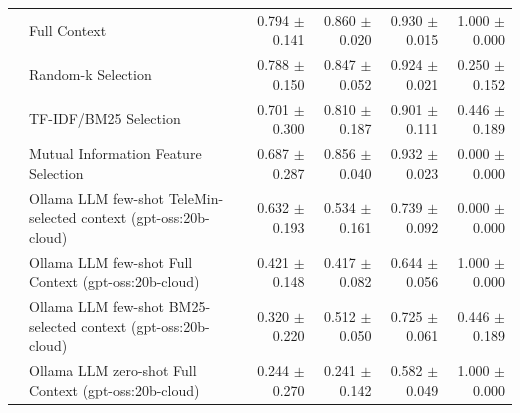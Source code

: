 \begin{tabular}{llrrrr}
 & Full Context & 0.794 $\pm$ 0.141 & 0.860 $\pm$ 0.020 & 0.930 $\pm$ 0.015 & 1.000 $\pm$ 0.000 \\
 & Random-k Selection & 0.788 $\pm$ 0.150 & 0.847 $\pm$ 0.052 & 0.924 $\pm$ 0.021 & 0.250 $\pm$ 0.152 \\
 & TF-IDF/BM25 Selection & 0.701 $\pm$ 0.300 & 0.810 $\pm$ 0.187 & 0.901 $\pm$ 0.111 & 0.446 $\pm$ 0.189 \\
 & Mutual Information Feature Selection & 0.687 $\pm$ 0.287 & 0.856 $\pm$ 0.040 & 0.932 $\pm$ 0.023 & 0.000 $\pm$ 0.000 \\
 & Ollama LLM few-shot TeleMin-selected context (gpt-oss:20b-cloud) & 0.632 $\pm$ 0.193 & 0.534 $\pm$ 0.161 & 0.739 $\pm$ 0.092 & 0.000 $\pm$ 0.000 \\
 & Ollama LLM few-shot Full Context (gpt-oss:20b-cloud) & 0.421 $\pm$ 0.148 & 0.417 $\pm$ 0.082 & 0.644 $\pm$ 0.056 & 1.000 $\pm$ 0.000 \\
 & Ollama LLM few-shot BM25-selected context (gpt-oss:20b-cloud) & 0.320 $\pm$ 0.220 & 0.512 $\pm$ 0.050 & 0.725 $\pm$ 0.061 & 0.446 $\pm$ 0.189 \\
 & Ollama LLM zero-shot Full Context (gpt-oss:20b-cloud) & 0.244 $\pm$ 0.270 & 0.241 $\pm$ 0.142 & 0.582 $\pm$ 0.049 & 1.000 $\pm$ 0.000 \\
\bottomrule
\end{tabular}

